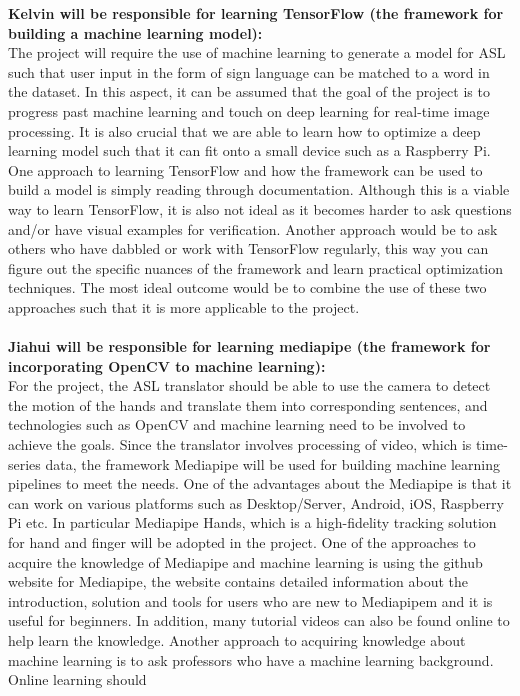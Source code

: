 \documentclass[12pt]{article}
\begin{document}
\textbf{Kelvin will be responsible for learning TensorFlow (the framework for building a machine learning model):}\\
The project will require the use of machine learning to generate a model for ASL such that user input in the form of sign language
can be matched to a word in the dataset. In this aspect, it can be assumed that the goal of the project is to progress past machine
learning and touch on deep learning for real-time image processing. It is also crucial that we are able to learn how to optimize a deep
learning model such that it can fit onto a small device such as a Raspberry Pi. One approach to learning TensorFlow and how the framework
can be used to build a model is simply reading through documentation. Although this is a viable way to learn TensorFlow, it is also not
ideal as it becomes harder to ask questions and/or have visual examples for verification. Another approach would be to ask others who
have dabbled or work with TensorFlow regularly, this way you can figure out the specific nuances of the framework and learn practical
optimization techniques. The most ideal outcome would be to combine the use of these two approaches such that it is more applicable to the project.\\
~\\
\textbf{Jiahui will be responsible for learning mediapipe (the framework for incorporating OpenCV to machine learning):}\\
For the project, the ASL translator should be able to use the camera to detect the motion of the hands and translate 
them into corresponding sentences, and technologies such as OpenCV and machine learning need to be involved to achieve 
the goals.  Since the translator involves processing of video, which is time-series data, the framework Mediapipe will be 
used for building machine learning pipelines to meet the needs. One of the advantages about the Mediapipe is that it can work on various platforms such as Desktop/Server, 
Android, iOS, Raspberry Pi etc. In particular Mediapipe Hands, which is a high-fidelity tracking solution for hand and finger will be adopted in the project. One of the 
approaches to acquire the knowledge of Mediapipe and machine learning is using the github website for Mediapipe, the website contains detailed information about the 
introduction, solution and tools for users who are new to Mediapipem and it is useful for beginners. In addition, many tutorial videos can also be found online to help 
learn the knowledge. Another approach to acquiring knowledge about machine learning is to ask professors who have a machine learning background. Online learning should 
\end{document}
